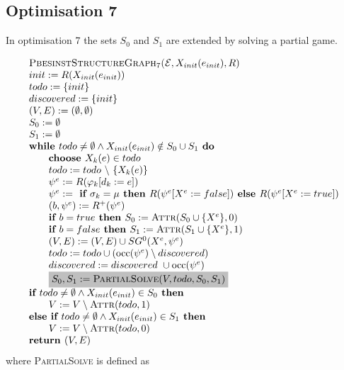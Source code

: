 \documentclass{article}
\newcommand{\Return}{\text{\textbf{return }}}
\begin{document}
\subsection{Optimisation 7}
In optimisation 7 the sets $S_0$ and $S_1$ are extended by solving a partial game.

\begin{equation*}
\begin{array}{l}
\textsc{PbesinstStructureGraph$_{7}$(}\mathcal{E}, X_{init}(e_{init}), R) \\ 
init:=R(X_{init}(e_{init})) \\
todo:=\{init\} \\
discovered:=\{init\} \\
(V,E) :=(\emptyset ,\emptyset ) \\ 
S_0:= \emptyset \\
S_1:= \emptyset \\
\textbf{while }todo \neq \emptyset \wedge X_{init}(e_{init}) \notin S_0 \cup S_1 \textbf{ do} \\ 
\qquad \text{\textbf{choose }}X_{k}(e)\in todo \\ 
\qquad todo:=todo\ \backslash \ \{X_{k}(e)\} \\ 
\qquad \psi ^{e}:=R(\varphi _{k}[d_{k}:=e]) \\ 
\qquad \psi^e := \textbf{ if } \sigma_k = \mu \textbf{ then } R(\psi^e[X^e := false])
\textbf{ else }  R(\psi^e[X^e := true]) \\
\qquad (b,\psi^e) := R^+(\psi^e) \\
\qquad \textbf{if $b = true$ then } S_0 := \textsc{Attr}(S_0 \cup \{ X^e \}, 0) \\
\qquad \textbf{if $b = false$ then } S_1 := \textsc{Attr}(S_1 \cup \{ X^e \}, 1) \\
\qquad (V,E) := (V,E) \cup SG^{0}(X^{e},\psi ^{e}) \\ 
\qquad todo:=todo\cup (\mathrm{occ}(\psi ^{e})\setminus discovered) \\
\qquad discovered:=discovered\ \cup \mathrm{occ}(\psi ^{e}) \\
\qquad \colorbox{lightgray}{$
S_0, S_1 := \textsc{PartialSolve}(V,todo,S_0,S_1) $}\\
\textbf{if } todo \neq \emptyset \land X_{init}(e_{init}) \in S_0 \textbf{ then }\\
\qquad V := V \setminus \textsc{Attr}(todo, 1) \\
\textbf{else if } todo \neq \emptyset \land X_{init}(e_{init}) \in S_1 \textbf{ then }\\
\qquad V := V \setminus \textsc{Attr}(todo, 0) \\
\Return (V, E)
\end{array}
\end{equation*}
where \textsc{PartialSolve} is defined as
\end{document}

